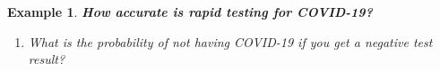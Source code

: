 \documentclass[12pt]{amsart}
\newtheorem{example}[theorem]{Example}
\begin{document}
\begin{example}  {\large \textbf{How accurate is rapid testing for COVID-19?} }
{\begin{enumerate}
\vspace{2cm}

\newpage
Given: $\mathbb{P}(T^+|D) = 0.943$, $\ \ \mathbb{P}(T^-|D^c) = 0.981$ %

\vspace{0.5cm}
\item What is the probability of not having COVID-19 if you get a negative test result?



\vspace{2cm}

\end{enumerate}
}
\end{example} 
\end{document}

